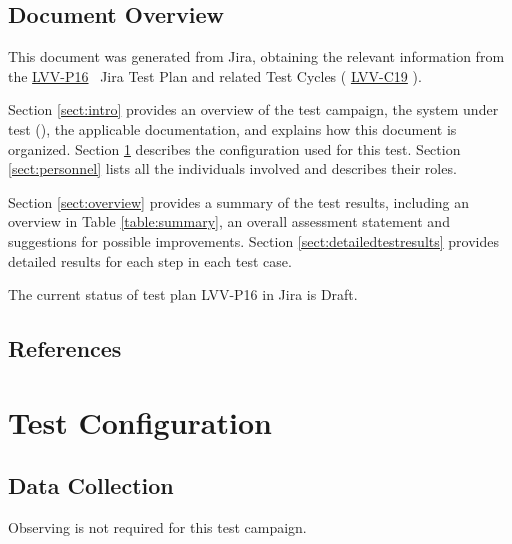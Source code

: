 \documentclass[DM,lsstdraft,STR,toc]{lsstdoc}
\begin{document}
\subsection{Document Overview}
\label{sect:docoverview}

This document was generated from Jira, obtaining the relevant information from the 
\href{https://jira.lsstcorp.org/secure/Tests.jspa#/testPlan/LVV-P16}{LVV-P16}
~Jira Test Plan and related Test Cycles (
  \href{https://jira.lsstcorp.org/secure/Tests.jspa#/testCycle/LVV-C19}{LVV-C19}
).


Section \ref{sect:intro} provides an overview of the test campaign, the system under test (\product{}), the applicable documentation, and explains how this document is organized.
Section \ref{sect:configuration}  describes the configuration used for this test.
Section \ref{sect:personnel} lists all the individuals involved and describes their roles.

Section \ref{sect:overview} provides a summary of the test results, including an overview in Table \ref{table:summary}, an overall assessment statement and suggestions for possible improvements.
Section \ref{sect:detailedtestresults} provides detailed results for each step in each test case.

The current status of test plan LVV-P16 in Jira is Draft.

\subsection{References}
\label{sect:references}
\renewcommand{\refname}{}

\section{Test Configuration}
\label{sect:configuration}

\subsection{Data Collection}

  Observing is not required for this test campaign.
\end{document}
